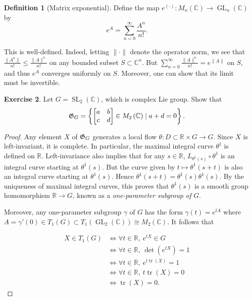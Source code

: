 \documentclass[10pt,letterpaper,cm]{nupset}
\theoremstyle{definition}
\newtheorem{defn}{Definition}[subsection]
\theoremstyle{theorem}
\newtheorem{exercise}[defn]{Exercise}
\theoremstyle{remark}
\newcommand{\C}{\mathbb C}
\newcommand{\G}{\frak{G}}
\newcommand{\R}{\mathbb{R}}
\newcommand{\1}{\mathbb{1}}
\newcommand{\0}{\vec 0}
\DeclareMathOperator{\tr}{tr}
\DeclareMathOperator{\GL}{GL}
\DeclareMathOperator{\SL}{SL}
\begin{document}
\begin{defn}[Matrix exponential]
Define the map $e^{\left(\cdot\right)} : M_n(\C) \to \GL_n(\C)$ by 
\[
e^A  = \sum_{n=0}^{\infty} \frac{A^n }{n!}.
\]
\end{defn}

This is well-defined. Indeed, letting $\|\cdot\|$ denote the operator norm, we see that $\frac{\|A^n\|}{n!}\leq \frac{\|A\|^n}{n!}$ on any bounded subset $S\subset \C^n$. But $\sum_{n=0}^{\infty}\frac{\|A\|^n}{n!} = e^{\|A\|}$ on $S$, and thus $e^A$ converges uniformly on $S$. Moreover, one can show that its limit must be invertible.

\begin{exercise}
Let $G= \SL_2\left(\C\right)$, which is complex Lie group. Show that $$\G_{G} = \left\{\begin{bmatrix} a & b \\ c & d \end{bmatrix} \in M_2\left(\C\right) \mid a+d =0\right\}.$$
\end{exercise}
\begin{proof}
Any element $X$ of $\G_{G}$ generates a local flow $\theta : D \subset \R \times G \to G$. Since $X$ is left-invariant, it is complete. In particular, the maximal integral curve $\theta^1$ is defined on $\R$.  Left-invariance also implies that for any $s\in \R$, $L_{\theta^1(s)} \circ \theta^1$ is an integral curve starting at $\theta^1(s)$. But the curve given by $t\mapsto \theta^1(s+t)$ is also an integral curve starting at $\theta^1(s)$. Hence $ \theta^1(s+t) = \theta^1(s)\theta^1(s)$. By the uniqueness of maximal integral curves, this proves that $\theta^1(s)$ is a smooth group homomorphism $\R \to G$, known as a \textit{one-parameter subgroup of $G$}. 

\smallskip

Moreover, any one-parameter subgroup $\gamma$ of $G$ has the form  $\gamma(t) = e^{tA}$ where $A = \gamma'(0) \in T_1(G) \subset T_1\left(\GL_2(\C)\right) \cong M_2(\C)$. It follows that 

\begin{align*}
X \in T_1(G)&  \iff \forall{t} \in \R, \  e^{tX} \in G 
\\ & \iff  \forall{t} \in \R, \  \det\left(e^{tX}\right) =1
\\ & \iff  \forall{t} \in \R, \ e^{t\tr(X)} =1
\\ & \iff \forall{t} \in \R, \ t\tr(X) = 0
\\ & \iff \tr(X) =0
. \end{align*}
\end{proof}
\end{document}
